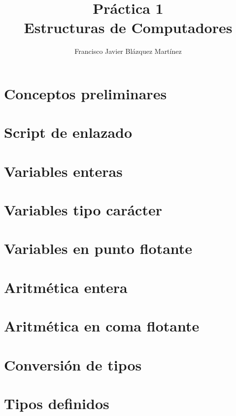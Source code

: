 \documentclass[12pt]{article}
\begin{document}
 
 
\title{\textbf{Práctica 1} \\ 
       \large Estructuras de Computadores}
\author{Francisco Javier Blázquez Martínez}
\maketitle

\section{Conceptos preliminares}

\section{Script de enlazado}

\section{Variables enteras}

\section{Variables tipo carácter}

\section{Variables en punto flotante}

\section{Aritmética entera}

\section{Aritmética en coma flotante}

\section{Conversión de tipos}

\section{Tipos definidos}




 
\end{document}
